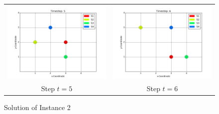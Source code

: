 \documentclass{scrartcl}
\begin{document}
\begin{figure}
\begin{tabular}{cc}
 \includegraphics[width=65mm]{routing_t_5.png} &   \includegraphics[width=65mm]{routing_t_6.png} \\
Step $t=5$ & Step $t=6$\\[6pt]
\end{tabular}
\caption{Solution of Instance 2}
\end{figure}
\end{document}
